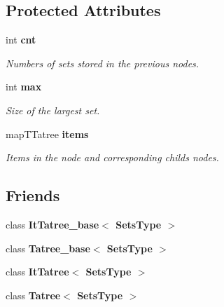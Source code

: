 \subsection*{Protected Attributes}
\begin{CompactItemize}
\item 
int {\bf cnt}\label{class_tatree_node_b0d8de188c9e2935d0983836de4f24f0}

\begin{CompactList}\small\item\em Numbers of sets stored in the previous nodes. \item\end{CompactList}\item 
int {\bf max}\label{class_tatree_node_5601ac158f5ef263bf987361dabce640}

\begin{CompactList}\small\item\em Size of the largest set. \item\end{CompactList}\item 
map\-TTatree {\bf items}\label{class_tatree_node_c164a7fff2a31d23da5305aa85c8c6eb}

\begin{CompactList}\small\item\em Items in the node and corresponding childs nodes. \item\end{CompactList}\end{CompactItemize}
\subsection*{Friends}
\begin{CompactItemize}
\item 
class {\bf It\-Tatree\_\-base$<$ Sets\-Type $>$}\label{class_tatree_node_1ce67181fc35f375e5115a7dfb1f0b3c}

\item 
class {\bf Tatree\_\-base$<$ Sets\-Type $>$}\label{class_tatree_node_4d067db2add706706c659a83c3cbcf41}

\item 
class {\bf It\-Tatree$<$ Sets\-Type $>$}\label{class_tatree_node_e63ac7816d95fec5ec77b16c2597e4b7}

\item 
class {\bf Tatree$<$ Sets\-Type $>$}\label{class_tatree_node_d092d4c79b0d187f36b3f75573889423}

\end{CompactItemize}

